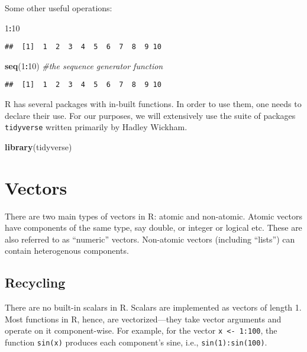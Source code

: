 \documentclass[]{article}
\newenvironment{Shaded}{\begin{snugshade}}{\end{snugshade}}
\newcommand{\KeywordTok}[1]{\textcolor[rgb]{0.13,0.29,0.53}{\textbf{#1}}}
\newcommand{\DecValTok}[1]{\textcolor[rgb]{0.00,0.00,0.81}{#1}}
\newcommand{\CommentTok}[1]{\textcolor[rgb]{0.56,0.35,0.01}{\textit{#1}}}
\newcommand{\OperatorTok}[1]{\textcolor[rgb]{0.81,0.36,0.00}{\textbf{#1}}}
\newcommand{\NormalTok}[1]{#1}
\begin{document}
Some other useful operations:

\begin{Shaded}
\begin{Highlighting}[]
\DecValTok{1}\OperatorTok{:}\DecValTok{10}
\end{Highlighting}
\end{Shaded}

\begin{verbatim}
##  [1]  1  2  3  4  5  6  7  8  9 10
\end{verbatim}

\begin{Shaded}
\begin{Highlighting}[]
\KeywordTok{seq}\NormalTok{(}\DecValTok{1}\OperatorTok{:}\DecValTok{10}\NormalTok{) }\CommentTok{#the sequence generator function}
\end{Highlighting}
\end{Shaded}

\begin{verbatim}
##  [1]  1  2  3  4  5  6  7  8  9 10
\end{verbatim}

R has several packages with in-built functions. In order to use them,
one needs to declare their use. For our purposes, we will extensively
use the suite of packages \texttt{tidyverse} written primarily by Hadley
Wickham.

\begin{Shaded}
\begin{Highlighting}[]
\KeywordTok{library}\NormalTok{(tidyverse)}
\end{Highlighting}
\end{Shaded}

\section{Vectors}\label{vectors}

There are two main types of vectors in R: atomic and non-atomic. Atomic
vectors have components of the same type, say double, or integer or
logical etc. These are also referred to as ``numeric'' vectors.
Non-atomic vectors (including ``lists'') can contain heterogenous
components.

\subsection{Recycling}\label{recycling}

There are no built-in scalars in R. Scalars are implemented as vectors
of length 1. Most functions in R, hence, are vectorized---they take
vector arguments and operate on it component-wise. For example, for the
vector \texttt{x\ \textless{}-\ 1:100}, the function \texttt{sin(x)}
produces each component's sine, i.e., \texttt{sin(1):sin(100)}.
\end{document}

